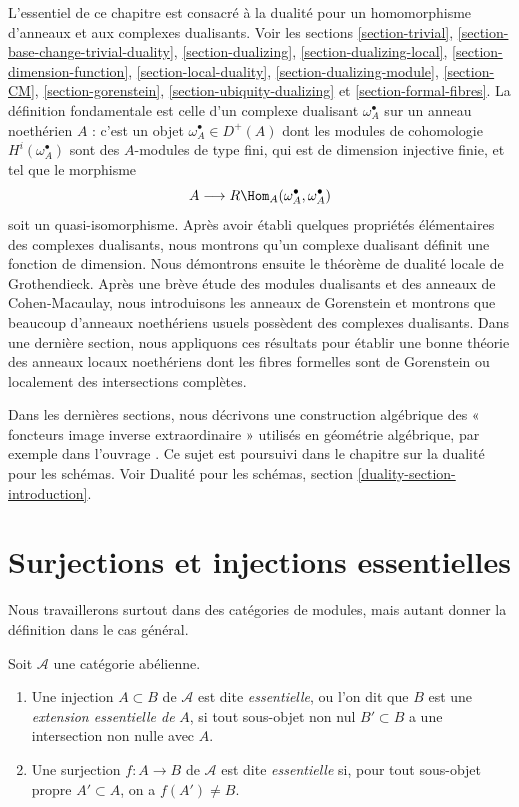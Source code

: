 \medskip\noindent
L'essentiel de ce chapitre est consacré à la dualité pour un homomorphisme
d'anneaux et aux complexes dualisants. Voir les sections \ref{section-trivial},
\ref{section-base-change-trivial-duality}, \ref{section-dualizing}, \ref{section-dualizing-local}, \ref{section-dimension-function}, \ref{section-local-duality}, \ref{section-dualizing-module},
\ref{section-CM}, \ref{section-gorenstein}, \ref{section-ubiquity-dualizing} et \ref{section-formal-fibres}.
La définition fondamentale est celle d'un complexe dualisant
$\omega_A^\bullet$ sur un anneau noethérien $A$ : c'est un objet
$\omega_A^\bullet \in D^{+}(A)$ dont les modules de cohomologie
$H^i(\omega_A^\bullet)$ sont des $A$-modules de type fini, qui est de dimension injective finie,
et tel que le morphisme
$$
A \longrightarrow R\Hom_A(\omega_A^\bullet, \omega_A^\bullet)
$$
soit un quasi-isomorphisme. Après avoir établi quelques propriétés
élémentaires des complexes dualisants, nous montrons qu'un complexe
dualisant définit une fonction de dimension. Nous démontrons ensuite
le théorème de dualité locale de Grothendieck. Après une brève étude
des modules dualisants et des anneaux de Cohen-Macaulay, nous introduisons
les anneaux de Gorenstein et montrons que beaucoup d'anneaux noethériens
usuels possèdent des complexes dualisants. Dans une dernière section,
nous appliquons ces résultats pour établir une bonne théorie des anneaux
locaux noethériens dont les fibres formelles sont de Gorenstein ou
localement des intersections complètes.

\medskip\noindent
Dans les dernières sections, nous décrivons une construction algébrique
des « foncteurs image inverse extraordinaire » utilisés en géométrie
algébrique, par exemple dans l'ouvrage \cite{RD}. Ce sujet est poursuivi
dans le chapitre sur la dualité pour les schémas. Voir
Dualité pour les schémas, section \ref{duality-section-introduction}.







\section{Surjections et injections essentielles}
\label{section-essential}

\noindent
Nous travaillerons surtout dans des catégories de modules, mais autant
donner la définition dans le cas général.

\begin{definition}
\label{definition-essential}
Soit $\mathcal{A}$ une catégorie abélienne.
\begin{enumerate}
\item Une injection $A \subset B$ de $\mathcal{A}$ est dite {\it essentielle},
ou l'on dit que $B$ est une {\it extension essentielle de} $A$,
si tout sous-objet non nul $B' \subset B$ a une intersection non nulle avec $A$.
\item Une surjection $f : A \to B$ de $\mathcal{A}$ est dite {\it essentielle}
si, pour tout sous-objet propre $A' \subset A$, on a $f(A') \not = B$.
\end{enumerate}
\end{definition}

